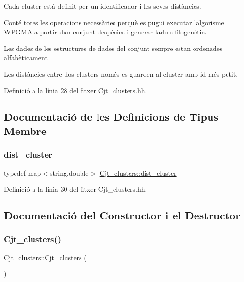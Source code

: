 Cada cluster està definit per un identificador i les seves distàncies.

Conté totes les operacions necessàries perquè es pugui executar l\textquotesingle{}algorisme W\+P\+G\+MA a partir d\textquotesingle{}un conjunt d\textquotesingle{}espècies i generar l\textquotesingle{}arbre filogenètic.

Les dades de les estructures de dades del conjunt sempre estan ordenades alfabèticament

Les distàncies entre dos clusters només es guarden al cluster amb id més petit. 

Definició a la línia 28 del fitxer Cjt\+\_\+clusters.\+hh.



\subsection{Documentació de les Definicions de Tipus Membre}
\mbox{\label{class_cjt__clusters_a9138a363184004ad38221f340abfccd5}} 
\subsubsection{\texorpdfstring{dist\+\_\+cluster}{dist\_cluster}}
{\footnotesize\ttfamily typedef map$<$string,double$>$ \hyperlink{class_cjt__clusters_a9138a363184004ad38221f340abfccd5}{Cjt\+\_\+clusters\+::dist\+\_\+cluster}\hspace{0.3cm}{\ttfamily [private]}}



Definició a la línia 30 del fitxer Cjt\+\_\+clusters.\+hh.



\subsection{Documentació del Constructor i el Destructor}
\mbox{\label{class_cjt__clusters_a10dd63eab0e8ea5b1ed13e81412d47a9}} 
\subsubsection{\texorpdfstring{Cjt\+\_\+clusters()}{Cjt\_clusters()}}
{\footnotesize\ttfamily Cjt\+\_\+clusters\+::\+Cjt\+\_\+clusters (\begin{DoxyParamCaption}{ }\end{DoxyParamCaption})}



